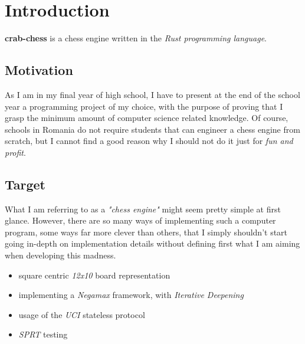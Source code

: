 
\section{Introduction}

\textbf{crab-chess} is a chess engine written in the \textit{Rust programming language}.

\subsection{Motivation}
As I am in my final year of high school, I have to present at the end of the school year a programming project of my
choice, with the purpose of proving that I grasp the minimum amount of computer science related knowledge. Of course,
schools in Romania do not require students that can engineer a chess engine from scratch, but I cannot find a good
reason why I should not do it just for \textit{fun and profit}.

\subsection{Target}
What I am referring to as a \textit{"chess engine"} might seem pretty simple at first glance. However, there are
so many ways of implementing such a computer program, some ways far more clever than others, that I simply shouldn't
start going in-depth on implementation details without defining first what I am aiming when developing this madness.

\begin{itemize}
    \item square centric \textit{12x10} board representation
    \item implementing a \textit{Negamax} framework, with \textit{Iterative Deepening}
    \item usage of the \textit{UCI} stateless protocol
    \item \textit{SPRT} testing
\end{itemize}